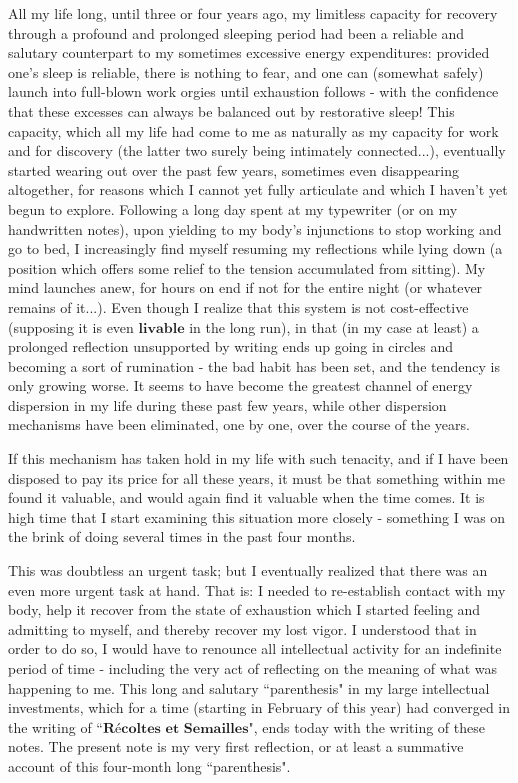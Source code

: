 All my life long, until three or four years ago, my limitless capacity for recovery through a profound and prolonged sleeping period had been a reliable and salutary counterpart to my sometimes excessive energy expenditures: provided one's sleep is reliable, there is nothing to fear, and one can (somewhat safely) launch into full-blown work orgies until exhaustion follows - with the confidence that these excesses can always be balanced out by restorative sleep! This capacity, which all my life had come to me as naturally as my capacity for work and for discovery (the latter two surely being intimately connected...), eventually started wearing out over the past few years, sometimes even disappearing altogether, for reasons which I cannot yet fully articulate and which I haven't yet begun to explore. Following a long day spent at my typewriter (or on my handwritten notes), upon yielding to my body's injunctions to stop working and go to bed, I increasingly find myself resuming my reflections while lying down (a position which offers some relief to the tension accumulated from sitting). My mind launches anew, for hours on end if not for the entire night (or whatever remains of it...). Even though I realize that this system is not cost-effective (supposing it is even $\textbf{livable}$ in the long run), in that (in my case at least) a prolonged reflection unsupported by writing ends up going in circles and becoming a sort of rumination - the bad habit has been set, and the tendency is only growing worse. It seems to have become the greatest channel of energy dispersion in my life during these past few years, while other dispersion mechanisms have been eliminated, one by one, over the course of the years.

If this mechanism has taken hold in my life with such tenacity, and if I have been disposed to pay its price for all these years, it must be that something within me found it valuable, and would again find it valuable when the time comes. It is high time that I start examining this situation more closely - something I was on the brink of doing several times in the past four months.

This was doubtless an urgent task; but I eventually realized that there was an even more urgent task at hand. That is: I needed to re-establish contact with my body, help it recover from the state of exhaustion which I started feeling and admitting to myself, and thereby recover my lost vigor. I understood that in order to do so, I would have to renounce all intellectual activity for an indefinite period of time - including the very act of reflecting on the meaning of what was happening to me. This long and salutary ``parenthesis" in my large intellectual investments, which for a time (starting in February of this year) had converged in the writing of $\textbf{``R\'ecoltes et Semailles"}$, ends today with the writing of these notes. The present note is my very first reflection, or at least a summative account of this four-month long ``parenthesis".

